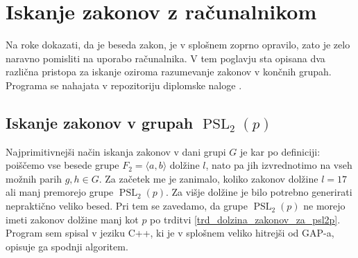 \section{Iskanje zakonov z računalnikom}
\label{sec_racunalnisko_iskanje}

Na roke dokazati, da je beseda zakon, je v splošnem zoprno opravilo, zato je zelo naravno pomisliti na uporabo računalnika. 
V tem poglavju sta opisana dva različna pristopa za iskanje oziroma razumevanje zakonov v končnih grupah. 
Programa se nahajata v repozitoriju diplomske naloge \cite{repo_2024}.

\subsection{Iskanje zakonov v grupah $\operatorname{PSL}_2(p)$}\label{sec_iskanje_psl2p}

Najprimitivnejši način iskanja zakonov v dani grupi $G$ je kar po definiciji: poiščemo vse besede grupe $F_2 = \langle a,b \rangle$ dolžine $l$, nato pa jih izvrednotimo na vseh možnih parih $g, h \in G$.
Za začetek me je zanimalo, koliko zakonov dolžine $l = 17$ ali manj premorejo grupe $\operatorname{PSL}_2(p)$. Za višje dolžine je bilo potrebno generirati nepraktično veliko besed. Pri tem se zavedamo, da grupe $\operatorname{PSL}_2(p)$ ne morejo imeti zakonov dolžine manj kot $p$ po trditvi \ref{trd_dolzina_zakonov_za_psl2p}.
Program sem spisal v jeziku C++, ki je v splošnem veliko hitrejši od GAP-a, opisuje ga spodnji algoritem.


